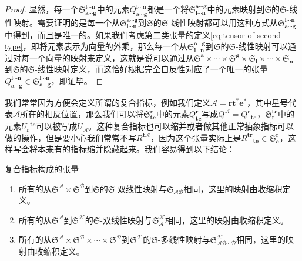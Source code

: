 \begin{proof}
	显然，每一个$\mathfrak{S}_{\boldsymbol{a} \cdots \boldsymbol{g}}^{\boldsymbol{l} \cdots \boldsymbol{n}}$中的元素$Q_{\boldsymbol{a} \cdots \boldsymbol{g}}^{\boldsymbol{l} \cdots \boldsymbol{n}}$都是一个将$\mathfrak{S}_{\boldsymbol{l} \cdots \boldsymbol{n}}^{\boldsymbol{a} \cdots \boldsymbol{g}}$中的元素映射到$\mathfrak{S}$的$\mathfrak{S}$-线性映射。需要证明的是每一个从$\mathfrak{S}_{\boldsymbol{l} \cdots \boldsymbol{n}}^{\boldsymbol{a} \cdots \boldsymbol{g}}$到$\mathfrak{S}$的$\mathfrak{S}$-线性映射都可以用这种方式从$\mathfrak{S}_{\boldsymbol{a} \cdots \boldsymbol{g}}^{\boldsymbol{l} \cdots \boldsymbol{n}}$中得到，而且是唯一的。如果我们考虑第二类张量的定义\ref{eq:tensor of second type}，即将元素表示为向量的外乘，那么每一个从$\mathfrak{S}_{\boldsymbol{l} \cdots \boldsymbol{n}}^{\boldsymbol{a} \cdots \boldsymbol{g}}$到$\mathfrak{S}$的$\mathfrak{S}$-线性映射可以通过对每一个向量的映射来定义，这就是说可以通过从$\mathfrak{S}^{\boldsymbol{a}} \times \cdots \times \mathfrak{S}^{\boldsymbol{g}} \times \mathfrak{S}_{\boldsymbol{l}} \times \cdots \times \mathfrak{S}_{\boldsymbol{n}}$到$\mathfrak{S}$的$\mathfrak{S}$-线性映射定义，而这恰好根据完全自反性对应了一个唯一的张量$Q_{\boldsymbol{a} \cdots \boldsymbol{g}}^{\boldsymbol{l} \cdots \boldsymbol{n}} \in \mathfrak{S}_{\boldsymbol{a} \cdots \boldsymbol{g}}^{\boldsymbol{l} \cdots \boldsymbol{n}}$，即证毕。
\end{proof}

我们常常因为方便会定义所谓的复合指标，例如我们定义$\mathcal{A} =\boldsymbol{rt}^{*}\boldsymbol{e}^{*}$，其中星号代表$\mathcal{A}$所在的相反位置，那么我们可以将$\mathfrak{S}_{\boldsymbol{te}}^{\boldsymbol{r}}$中的元素$Q_{\boldsymbol{te}}^{\boldsymbol{r}}$写成$Q^{\mathcal{A}} =Q^{\boldsymbol{r}}{}_{\boldsymbol{te}}$，$\mathfrak{S}_{\boldsymbol{r}}^{\boldsymbol{te}}$中的元素$U{_{\boldsymbol{r}}}^{\boldsymbol{te}}$可以被写成$U_{\mathcal{A}}$。这种复合指标也可以缩并或者做其他正常抽象指标可以做的操作，但是要小心我们常常不写$R^{\boldsymbol{t}\mathcal{A}}$，因为这个张量实际上是$R^{\boldsymbol{tr}}{}_{\boldsymbol{te}} \in \mathfrak{S}_{\boldsymbol{e}}^{\boldsymbol{r}}$，这样写会将本来有的指标缩并隐藏起来。我们容易得到以下结论：

\begin{them}[label={them:tensor of composed index}]{复合指标构成的张量}
	\begin{enumerate}[label=(\alph*)]
		\item 所有的从$\mathfrak{S}^{\mathcal{A}} \times \mathfrak{S}^{\mathcal{B}}$到$\mathfrak{S}$的$\mathfrak{S}$-双线性映射与$\mathfrak{S}_{\mathcal{AB}}$相同，这里的映射由收缩积定义。
		\item 所有的从$\mathfrak{S}^{\mathcal{A}}$到$\mathfrak{S}^{\mathcal{K}}$的$\mathfrak{S}$-双线性映射与$\mathfrak{S}_{\mathcal{A}}^{\mathcal{K}}$相同，这里的映射由收缩积定义。
		\item 所有的从$\mathfrak{S}^{\mathcal{A}} \times \mathfrak{S}^{\mathcal{B}} \times \cdots \times \mathfrak{S}^{\mathcal{D}}$到$\mathfrak{S}^{\mathcal{K}}$的$\mathfrak{S}$-多线性映射与$\mathfrak{S}_{\mathcal{AB} \cdots \mathcal{D}}^{\mathcal{K}}$相同，这里的映射由收缩积定义。
	\end{enumerate}
\end{them}

